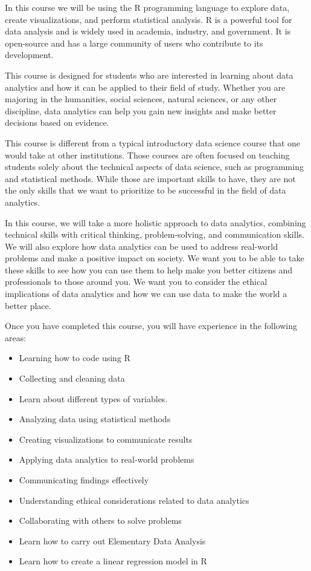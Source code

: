 \documentclass[
  letterpaper,
  DIV=11,
  numbers=noendperiod]{scrreprt}
\providecommand{\tightlist}{%
  \setlength{\itemsep}{0pt}\setlength{\parskip}{0pt}}\usepackage{longtable,booktabs,array}
\begin{document}
In this course we will be using the R programming language to explore
data, create visualizations, and perform statistical analysis. R is a
powerful tool for data analysis and is widely used in academia,
industry, and government. It is open-source and has a large community of
users who contribute to its development.

This course is designed for students who are interested in learning
about data analytics and how it can be applied to their field of study.
Whether you are majoring in the humanities, social sciences, natural
sciences, or any other discipline, data analytics can help you gain new
insights and make better decisions based on evidence.

This course is different from a typical introductory data science course
that one would take at other institutions. Those courses are often
focused on teaching students solely about the technical aspects of data
science, such as programming and statistical methods. While those are
important skills to have, they are not the only skills that we want to
prioritize to be successful in the field of data analytics.

In this course, we will take a more holistic approach to data analytics,
combining technical skills with critical thinking, problem-solving, and
communication skills. We will also explore how data analytics can be
used to address real-world problems and make a positive impact on
society. We want you to be able to take these skills to see how you can
use them to help make you better citizens and professionals to those
around you. We want you to consider the ethical implications of data
analytics and how we can use data to make the world a better place.

Once you have completed this course, you will have experience in the
following areas:

\begin{itemize}
\tightlist
\item
  Learning how to code using R
\item
  Collecting and cleaning data
\item
  Learn about different types of variables.
\item
  Analyzing data using statistical methods
\item
  Creating visualizations to communicate results
\item
  Applying data analytics to real-world problems
\item
  Communicating findings effectively
\item
  Understanding ethical considerations related to data analytics
\item
  Collaborating with others to solve problems
\item
  Learn how to carry out Elementary Data Analysis
\item
  Learn how to create a linear regression model in R
\end{itemize}
\end{document}
